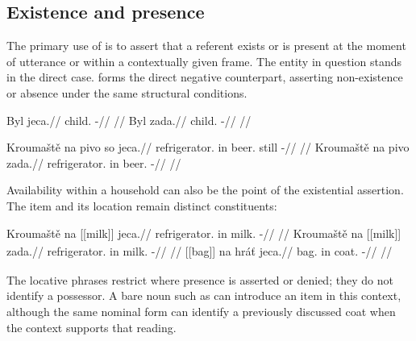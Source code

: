 \subsection{Existence and presence}\label{sec:existence-and-presence}

The primary use of  is to assert that a referent exists or is present
at the moment of utterance or within a contextually given frame. The entity in
question stands in the direct case.  forms the direct negative
counterpart, asserting non-existence or absence under the same structural
conditions.

\pex
\a
\begingl
\gla Byl jeca.//
\glb child.\Dir{} \Exst{}-\Cont{}//
\glft {}//
\endgl
\a
\begingl
\gla Byl zada.//
\glb child.\Dir{} \NegExst{}-\Cont{}//
\glft {}//
\endgl
\xe

\pex
\a
\begingl
\gla Kroumaště na pivo so jeca.//
\glb refrigerator.\Ind{} in beer.\Dir{} still \Exst{}-\Cont{}//
\glft {}//
\endgl
\a
\begingl
\gla Kroumaště na pivo zada.//
\glb refrigerator.\Ind{} in beer.\Dir{} \NegExst{}-\Cont{}//
\glft {}//
\endgl
\xe

Availability within a household can also be the point of the existential
assertion. The item and its location remain distinct constituents:

\pex\label{ex:predicate-household-availability}
\a
\begingl
\gla Kroumaště na \textnormal{[[milk]]}\textsubscript{\Dir{}} jeca.//
\glb refrigerator.\Ind{} in milk.\Dir{} \Exst{}-\Cont{}//
\glft {}
//
\endgl
\a
\begingl
\gla Kroumaště na \textnormal{[[milk]]}\textsubscript{\Dir{}} zada.//
\glb refrigerator.\Ind{} in milk.\Dir{} \NegExst{}-\Cont{}//
\glft {}
//
\endgl
\a
\begingl
\gla \textnormal{[[bag]]}\textsubscript{\Ind{}} na hráť jeca.//
\glb bag.\Ind{} in coat.\Dir{} \Exst{}-\Cont{}//
\glft {}
//
\endgl
\xe

The locative phrases restrict where presence is asserted or denied;
they do not identify a possessor. A bare noun such as 
can introduce an item in this context, although the same nominal form can
identify a previously discussed coat when the context supports that reading.

